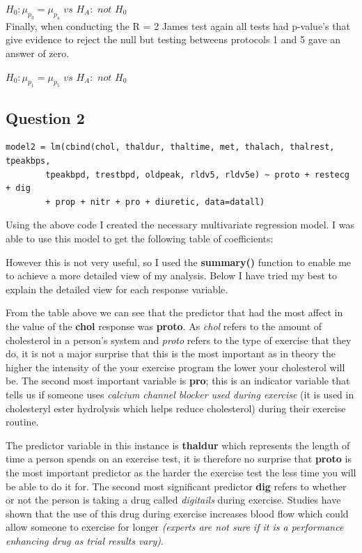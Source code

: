 \documentclass[a4paper]{article}
\begin{document}

$H_0 : \mu_{p_3} = \mu_{p_4}$ $vs$ $H_A :$ $not$ $H_0$\\

Finally, when conducting the R = 2 James test again all tests had p-value's that give evidence to reject the null but testing betweens protocols 1 and 5 gave an answer of zero.

$H_0 : \mu_{p_1} = \mu_{p_5}$ $vs$ $H_A :$ $not$ $H_0$\\

\newpage
\subsection{Question 2}

\begin{lstlisting}[frame=single]
model2 = lm(cbind(chol, thaldur, thaltime, met, thalach, thalrest, tpeakbps,
		tpeakbpd, trestbpd, oldpeak, rldv5, rldv5e) ~ proto + restecg + dig
		+ prop + nitr + pro + diuretic, data=datall)
\end{lstlisting}

Using the above code I created the necessary multivariate regression model.
I was able to use this model to get the following table of coefficients:

However this is not very useful, so I used the \textbf{summary()} function to
enable me to achieve a more detailed view of my analysis. Below I have tried
my best to explain the detailed view for each response variable.

\newpage

From the table above we can see that the predictor that had the most
affect in the value of the \textbf{chol} response was \textbf{proto}. As
\textit{chol} refers to the amount of cholesterol in a person's system and
\textit{proto} refers to the type of exercise that they do, it is not a major
surprise that this is the most important as in theory the higher the intensity
of the your exercise program the lower your cholesterol will be. The second most
important variable is \textbf{pro}; this is an indicator variable that tells us
if someone uses \textit{calcium channel blocker used during exercise} (it is
used in cholesteryl ester hydrolysis which helps reduce cholesterol) during
their exercise routine.

\newpage

The predictor variable in this instance is \textbf{thaldur} which represents the
length of time a person spends on an exercise test, it is therefore no surprise
that \textbf{proto} is the most important predictor as the harder the exercise
test the less time you will be able to do it for. The second most significant
predictor \textbf{dig} refers to whether or not the person is taking a drug
called \textit{digitails} during exercise. Studies have shown that the use of
this drug during exercise increases blood flow which could allow someone to
exercise for longer \textit{(experts are not sure if it is a performance
enhancing drug as trial results vary)}.
\end{document}
